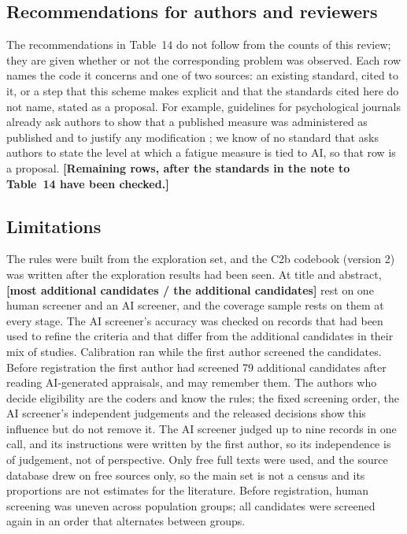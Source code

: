\documentclass[11pt]{article}
\newcommand{\tbd}[1]{\textbf{[#1]}}
\begin{document}
\subsection{Recommendations for authors and reviewers}
The recommendations in Table~14 do not follow from the counts of this review; they are given whether or not the
corresponding problem was observed. Each row names the code it concerns and one of two sources: an existing standard,
cited to it, or a step that this scheme makes explicit and that the standards cited here do not name, stated as a
proposal. For example, guidelines for psychological journals already ask authors to show that a published measure
was administered as published and to justify any modification \citep{elson2023}; we know of no standard that asks
authors to state the level at which a fatigue measure is tied to AI, so that row is a proposal.
\tbd{Remaining rows, after the standards in the note to Table~14 have been checked.}

\subsection{Limitations}
The rules were built from the exploration set, and the C2b codebook (version 2) was written after the exploration
results had been seen. At title and abstract, \tbd{most additional candidates / the additional candidates} rest on
one human screener and an AI screener, and the coverage sample rests on them at every stage. The AI screener's
accuracy was checked on records that had been used to refine the criteria and that differ from the additional
candidates in their mix of studies. Calibration ran while the first author screened the candidates. Before registration the first author had screened 79 additional candidates after reading AI-generated
appraisals, and may remember them. The authors who decide eligibility are the coders and know the rules; the fixed
screening order, the AI screener's independent judgements and the released decisions show this influence but do not
remove it. The AI screener judged up to nine records in one call, and its instructions were written by the first
author, so its independence is of judgement, not of perspective. Only free full texts were used, and the source
database drew on free sources only, so the main set is not a census and its proportions are not estimates for the
literature. Before registration, human screening was uneven across population groups; all candidates were screened
again in an order that alternates between groups.
\end{document}
